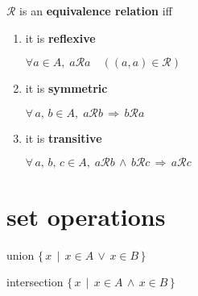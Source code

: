 \documentclass{article}
\newcommand{\spaced}[1]{\, #1 \,}
\newcommand{\sland}{\spaced{\land}}
\newcommand{\slor}{\spaced{\lor}}
\newcommand{\simplies}{\spaced{\Rightarrow}}
\newcommand{\buildset}[2]{\{\spaced{#1} \mid \spaced{#2} \}}
\begin{document}
        \color{Purple}
        \begin{definition}\label{equivalence relation}
            $\mathcal{R}$ is an \textbf{equivalence relation} iff
            \begin{enumerate}[label={\arabic*)}, partopsep=0.5em, itemsep=0.25em, left=6em]
            
                \item it is \textbf{reflexive}
                \begin{definition}[reflexive]\label{reflexive}
                    $\forall a \in A, \; a\mathcal{R}a \quad ((a, a) \in \mathcal{R})$\end{definition}
                
                \item it is \textbf{symmetric}
                \begin{definition}[symmetric]\label{symmetric}
                    $\forall \, a, \, b \in A, \; a\mathcal{R}b \simplies b\mathcal{R}a$
                \end{definition}
                
                \item it is \textbf{transitive}
                \begin{definition}[transitive]\label{transitive}
                    $\forall \, a, \, b, \, c \in A, \; a\mathcal{R}b \sland b\mathcal{R}c \simplies a\mathcal{R}c$
                \end{definition}
                
            \end{enumerate}
        \end{definition}
        
    \color{Black}    
    \newpage
    \section{set operations}
    
        \begin{notation}[$A \cup B$]
            union \tab\tab\tab\tab\tab\tab $\buildset{x}{x \in A \slor x \in B}$
        \end{notation}
        
        \begin{notation}[$A \cap B$]
            intersection \tab\tab\tab\tab\tab $\buildset{x}{x \in A \sland x \in B}$
        \end{notation}
        
\end{document}
